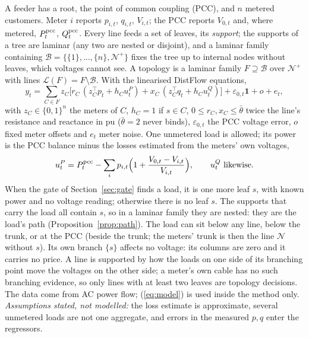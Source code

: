 \documentclass[journal,onecolumn,11pt]{IEEEtran}
\newcommand{\tp}{^{\top}}
\newcommand{\one}{\mathbf{1}}
\newcommand{\Lin}{\mathcal{L}}
\newcommand{\Nset}{\mathcal{N}}
\newcommand{\Bset}{\mathcal{B}}
\begin{document}
A feeder has a root, the point of common coupling (PCC), and $n$ metered customers. Meter $i$ reports $p_{i,t}$,
$q_{i,t}$, $V_{i,t}$; the PCC reports $V_{0,t}$ and, where metered, $P^{\rm pcc}_t$, $Q^{\rm pcc}_t$. Every line feeds a set
of leaves, its \emph{support}; the supports of a tree are laminar (any two are nested or disjoint), and a laminar family
containing $\Bset=\{\{1\},\dots,\{n\},\Nset^+\}$ fixes the tree up to internal nodes without leaves, which voltages cannot
see. A topology is a laminar family $F\supseteq\Bset$ over $\Nset^+$ with lines $\Lin(F)=F\setminus\Bset$. With the
linearised DistFlow equations,
\begin{equation}\label{eq:model}
y_t=\sum_{C\in F} z_C\big[r_C\,(z_C\tp p_t+h_C u^P_t)+x_C\,(z_C\tp q_t+h_C u^Q_t)\big]+\varepsilon_{0,t}\one+o+e_t ,
\end{equation}
with $z_C\in\{0,1\}^n$ the meters of $C$, $h_C=1$ if $s\in C$, $0\le r_C,x_C\le\bar\theta$ twice the line's resistance and
reactance in pu ($\bar\theta=2$ never binds), $\varepsilon_{0,t}$ the PCC voltage error, $o$ fixed meter offsets and $e_t$
meter noise. One unmetered load is allowed; its power is the PCC balance minus the losses estimated from the meters' own
voltages,
\begin{equation}\label{eq:balance}
u^P_t=P^{\rm pcc}_t-\sum_i p_{i,t}\Big(1+\frac{V_{0,t}-V_{i,t}}{V_{i,t}}\Big),\qquad u^Q_t\ \text{likewise}.
\end{equation}
When the gate of Section~\ref{sec:gate} finds a load, it is one more leaf $s$, with known power and no voltage reading;
otherwise there is no leaf $s$. The supports that carry the load all contain $s$, so in a laminar family they are nested:
they are the load's path (Proposition~\ref{prop:path}). The load can sit below any line, below the trunk, or at the PCC
(beside the trunk; the meters' trunk is then the line $\Nset$ without $s$). Its own branch $\{s\}$ affects no voltage: its
columns are zero and it carries no price. A line is supported by how the loads on one side of its branching point move the
voltages on the other side; a meter's own cable has no such branching evidence, so only lines with at least two leaves are
topology decisions. The data come from AC power flow; (\ref{eq:model}) is used inside the method only. \emph{Assumptions
stated, not modelled:} the loss estimate is approximate, several unmetered loads are not one aggregate, and errors in the
measured $p,q$ enter the regressors.

\end{document}
